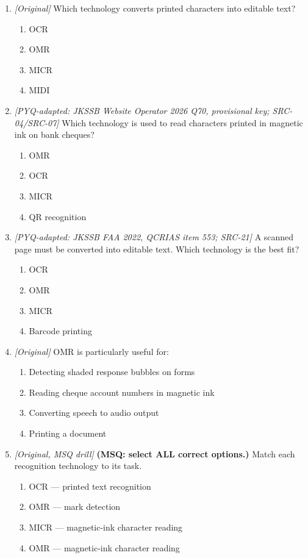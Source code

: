 \begin{enumerate}[label=\textbf{Q\arabic*.}, leftmargin=*]
\begin{enumerate}[label=\Alph*.]
    \item MICR reads magnetic-ink characters on cheques.
    \item All three devices produce printed output on paper.
  \end{enumerate}
\item \textit{[Original]} Which technology converts printed characters into editable text?
  \begin{enumerate}[label=\Alph*.]
\item OCR
   \item OMR
   \item MICR
   \item MIDI
  \end{enumerate}

\item \textit{[PYQ-adapted: JKSSB Website Operator 2026 Q70, provisional key; SRC-04/SRC-07]} Which technology is used to read characters printed in magnetic ink on bank cheques?
  \begin{enumerate}[label=\Alph*.]
\item OMR
   \item OCR
   \item MICR
   \item QR recognition
  \end{enumerate}

\item \textit{[PYQ-adapted: JKSSB FAA 2022, QCRIAS item 553; SRC-21]} A scanned page must be converted into editable text. Which technology is the best fit?
  \begin{enumerate}[label=\Alph*.]
\item OCR
   \item OMR
   \item MICR
   \item Barcode printing
  \end{enumerate}

\item \textit{[Original]} OMR is particularly useful for:
  \begin{enumerate}[label=\Alph*.]
\item Detecting shaded response bubbles on forms
   \item Reading cheque account numbers in magnetic ink
   \item Converting speech to audio output
   \item Printing a document
  \end{enumerate}

\item \textit{[Original, MSQ drill]} \textbf{(MSQ: select ALL correct options.)} Match each recognition technology to its task.
  \begin{enumerate}[label=\Alph*.]
\item OCR --- printed text recognition
   \item OMR --- mark detection
   \item MICR --- magnetic-ink character reading
   \item OMR --- magnetic-ink character reading
  \end{enumerate}


\end{enumerate}
